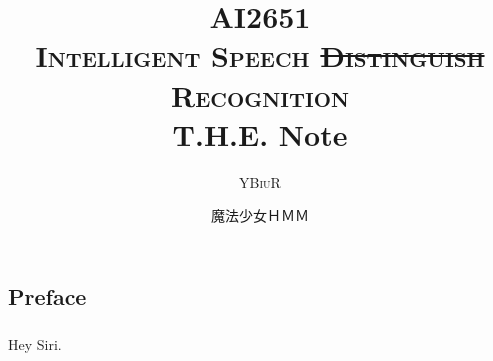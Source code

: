 \documentclass[oneside]{book}
\title{\textsc{AI2651\\Intelligent Speech \sout{Distinguish} Recognition}\\ T.H.E. Note}
\author{\textsc{YBiuR}}
\date{魔法少女ＨＭＭ}
\theoremstyle{definition}
\theoremstyle{remark}
\begin{document}
\begin{spacing}{1.5}
\setlength{\parindent}{0em}

\frontmatter
\maketitle
\chapter*{Preface}
\paragraph{}Hey Siri.
\mainmatter


\end{spacing}
\end{document}

